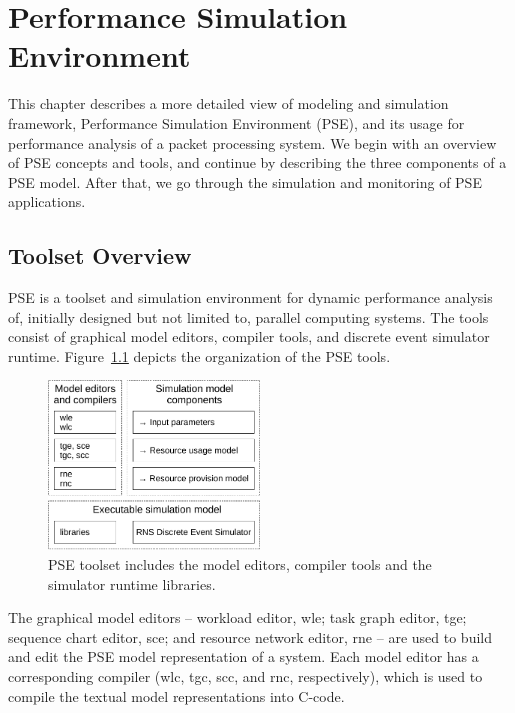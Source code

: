 \chapter{Performance Simulation Environment}
\label{chapter:performance-simulation-environment}

This chapter describes a more detailed view of modeling and simulation framework, Performance Simulation Environment (PSE), and its usage for performance analysis of a packet processing system. We begin with an overview of PSE concepts and tools, and continue by describing the three components of a PSE model. After that, we go through the simulation and monitoring of PSE applications.

\section{Toolset Overview}
\label{sec:toolset-overview}

PSE is a toolset and simulation environment for dynamic performance analysis of, initially designed but not limited to, parallel computing systems. The tools consist of graphical model editors, compiler tools, and discrete event simulator runtime. Figure~\ref{fig:pse-toolset} depicts the organization of the PSE tools.

\begin{figure}[]
  \begin{center}
    \includegraphics[width=0.5\textwidth]{images/pse-toolset-overview.pdf}
    \caption{PSE toolset includes the model editors, compiler tools and the simulator runtime libraries.}
    \label{fig:pse-toolset}
  \end{center}
\end{figure}

The graphical model editors -- workload editor, wle; task graph editor, tge; sequence chart editor, sce; and resource network editor, rne -- are used to build and edit the PSE model representation of a system. Each model editor has a corresponding compiler (wlc, tgc, scc, and rnc, respectively), which is used to compile the textual model representations into C-code. %

